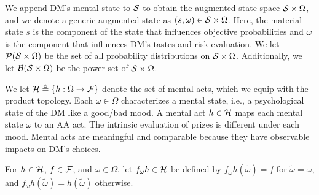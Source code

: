 \documentclass[11pt,oneside]{article}
\theoremstyle{plain}
\theoremstyle{plain}
\theoremstyle{plain}
\theoremstyle{plain}
\theoremstyle{plain}
\theoremstyle{definition}
\theoremstyle{definition}
\theoremstyle{remark}
\theoremstyle{plain}
\newcommand{\F}{{\cal F}}
\newcommand{\mcs}{{\cal S}}
\newcommand{\omix}[2]{#1_\omega #2 }
\begin{document}
We append DM's mental state to $\mcs$ to obtain the augmented state space $\mcs \times \Omega$, and we denote a generic augmented state as $(s,\omega) \in \mcs \times \Omega$.
Here, the material state $s$ is the component of the state that influences objective probabilities and $\omega$ is the component that influences DM's tastes and risk evaluation.
We let ${\cal P}(\mcs \times \Omega)$ be the set of all probability distributions on $\mcs \times \Omega$.
Additionally, we let ${\cal B}(\mcs \times \Omega)$ be the power set of $\mcs \times \Omega$.

We let ${\cal H}\triangleq\{h:\Omega \to \F\}$ denote the set of mental acts, which we equip with the product topology. Each $\omega \in \Omega$ characterizes
a mental state, i.e., a psychological state of the DM like a good/bad mood. A mental act $h \in {\cal H}$ maps each mental state $\omega$ to an AA act.
The intrinsic evaluation of prizes is different under each mood.
Mental acts are meaningful and comparable because they have observable impacts on DM's choices.

For $h \in {\cal H}$, $f \in \F$, and $\omega \in \Omega$, let $\omix{f}{h} \in {\cal H}$ be defined by $\omix{f}{h}(\tilde{\omega}) = f$ for $\tilde{\omega} = \omega$, and $\omix{f}{h}(\tilde{\omega}) = h(\tilde{\omega})$ otherwise.
\end{document}
